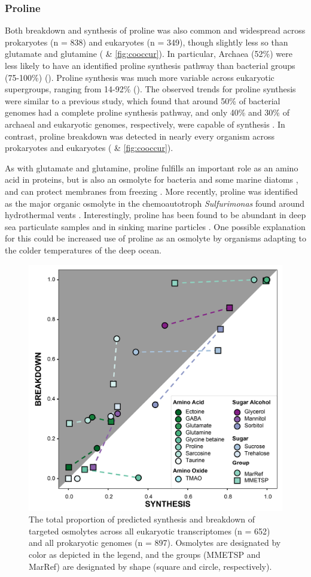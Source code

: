 \documentclass[utf8]{frontiersSCNS} %
\begin{document}
\subsubsection*{Proline}
Both breakdown and synthesis of proline was also common and widespread across prokaryotes (n = 838) and eukaryotes (n = 349), though slightly less so than glutamate and glutamine ( \& \ref{fig:cooccur}). In particular, Archaea (52\%) were less likely to have an identified proline synthesis pathway than bacterial groups (75-100\%) (). Proline synthesis was much more variable across eukaryotic supergroups, ranging from 14-92\% (). The observed trends for proline synthesis were similar to a previous study, which found that around 50\% of bacterial genomes had a complete proline synthesis pathway, and only 40\% and 30\% of archaeal and eukaryotic genomes, respectively, were capable of synthesis \citep{Mee2012}. In contrast, proline breakdown was detected in nearly every organism across prokaryotes and eukaryotes ( \& \ref{fig:cooccur}). 

As with glutamate and glutamine, proline fulfills an important role as an amino acid in proteins, but is also an osmolyte for bacteria \citep{Burg2008,Brill2011} and some marine diatoms \citep{Dawson2020,Dawson2020.2}, and can protect membranes from freezing \citep{Yancey2005}. More recently, proline was identified as the major organic osmolyte in the chemoautotroph \emph{Sulfurimonas} found around hydrothermal vents \citep{Gotz2018}. Interestingly, proline has been found to be abundant in deep sea particulate samples \citep{Takasu2015,Johnson2021} and in sinking marine particles \citep{Johnson2020}. One possible explanation for this could be increased use of proline as an osmolyte by organisms adapting to the colder temperatures of the deep ocean.
\begin{figure}[t!]
    \centering
    \includegraphics[width = 0.6\columnwidth]{Figures/Synthesis-comparison_v2021-03-14-01.png}
    \caption{The total proportion of predicted synthesis and breakdown of targeted osmolytes across all eukaryotic transcriptomes (n = 652) and all prokaryotic genomes (n = 897). Osmolytes are designated by color as depicted in the legend, and the groups (MMETSP and MarRef) are designated by shape (square and circle, respectively). }
    \label{fig:euk-bac-comp}
\end{figure}
\end{document}
